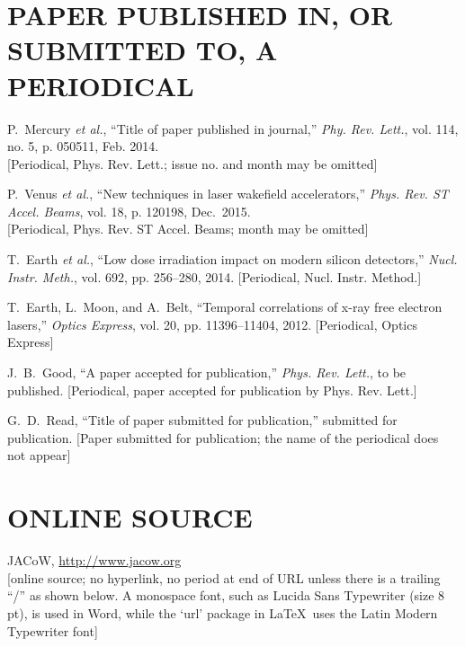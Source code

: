 \documentclass[letterpaper,  %
              ]{jacow-2_3}   %
\begin{document}
\section{PAPER PUBLISHED IN, OR SUBMITTED TO, A PERIODICAL}

\begin{thebibliography}{99} %
  \setcounter{enumi}{5}
		P.~Mercury \emph{et al.}, 
		“Title of paper published in journal,”
		\emph{Phy. Rev. Lett.}, vol. 114, no. 5, 
		p. 050511, Feb. 2014. \\
	\textcolor{jblue}{[Periodical, Phys. Rev. Lett.; 
		             issue no. and month may be omitted]}

		P.~Venus \emph{et al.}, 
		“New techniques in laser wakefield accelerators,”
		\emph{Phys. Rev. ST Accel. Beams}, vol. 18, 
		p. 120198, Dec.~2015.   \\
	\textcolor{jblue}{[Periodical, Phys. Rev. ST Accel. Beams; 
			              month may be omitted]}

		T.~Earth \emph{et al.}, 
		“Low dose irradiation impact on modern silicon detectors,”
		\emph{Nucl. Instr. Meth.}, vol. 692, pp. 256--280, 2014.
	\textcolor{jblue}{[Periodical, Nucl. Instr. Method.]}
	
		T.~Earth, L.~Moon, and A.~Belt, 
		“Temporal correlations of x-ray free electron lasers,”
		\emph{Optics Express}, vol. 20, pp. 11396--11404, 2012.
	\textcolor{jblue}{[Periodical, Optics Express]}

		J.~B.~Good, 
		“A paper accepted for publication,”
		\emph{Phys. Rev. Lett.}, to be published.
	\textcolor{jblue}{[Periodical, paper accepted for publication 
		              by Phys. Rev. Lett.]}

		G.~D.~Read, 
		“Title of paper submitted for publication,”
		submitted for publication.
	\textcolor{jblue}{[Paper submitted for publication; the name of the 
					  periodical does not appear]}
\end{thebibliography}

\section{ONLINE SOURCE}

\begin{thebibliography}{99} %
  \setcounter{enumi}{11}
		JACoW, \url{http://www.jacow.org} \\
		\textcolor{jvio}{[online source; no hyperlink, no period at end of URL
						  unless there is a trailing “/” as shown below. A monospace
						  font, such as Lucida Sans Typewriter (size 8 pt), is used in
					      Word, while the ‘url’ package in \LaTeX\ uses the Latin Modern Typewriter font]}

\end{thebibliography}
\end{document}
